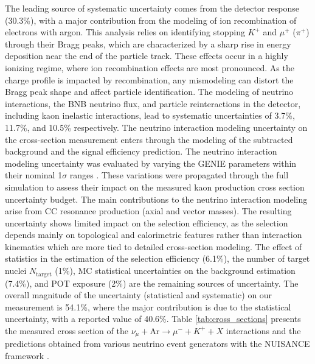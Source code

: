 \documentclass[aps,prd,longbibliography,twocolumn,showpacs,superscriptaddress,floatfix,10pt]{revtex4-1}
\begin{document}
The leading source of systematic uncertainty comes from the detector response (30.3\%), with a major contribution from the modeling of ion recombination of electrons with argon. This analysis relies on identifying stopping $K^+$ and $\mu^+$ ($\pi^+$) through their Bragg peaks, which are characterized by a sharp rise in energy deposition near the end of the particle track. These effects occur in a highly ionizing regime, where ion recombination effects are most pronounced. As the charge profile is impacted by recombination, any mismodeling can distort the Bragg peak shape and affect particle identification. 
The modeling of neutrino interactions, the BNB neutrino flux, and particle reinteractions in the detector, including kaon inelastic interactions, lead to systematic uncertainties of 3.7\%, 11.7\%, and 10.5\% respectively.
The neutrino interaction modeling uncertainty on the cross-section measurement enters through the modeling of the subtracted background and the signal efficiency prediction. The neutrino interaction modeling uncertainty was evaluated by varying the GENIE parameters within their nominal 1$\sigma$ ranges \cite{MicroBooNE:2021ccs}. These variations were propagated through the full simulation to assess their impact on the measured kaon production cross section uncertainty budget. The main contributions to the neutrino interaction modeling arise from CC resonance production (axial and vector masses). The resulting uncertainty shows limited impact on the selection efficiency, as the selection depends mainly on topological and calorimetric features rather than interaction kinematics which are more tied to detailed cross-section modeling.
The effect of statistics in the estimation of the selection efficiency (6.1\%), the number of target nuclei $N_{\text{target}}$ (1\%), MC statistical uncertainties on the background estimation (7.4\%), and POT exposure (2\%) are the remaining sources of uncertainty. The overall magnitude of the uncertainty (statistical and systematic) on our measurement is 54.1\%, where the major contribution is due to the statistical uncertainty, with a reported value of 40.6\%. Table \ref{tab:cross_sections} presents the measured cross section of the  $\nu_{\mu} + \text{Ar} \rightarrow \mu^{-} + K^{+} + X$ interactions and the predictions obtained from various neutrino event generators with the NUISANCE framework \cite{Stowell:2016jfr}.
\end{document}
